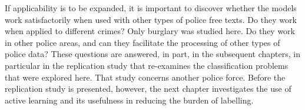 If applicability is to be expanded, it is important to discover whether the models work satisfactorily when used with other types of police free texts. Do they work when applied to different crimes? Only burglary was studied here. Do they work in other police areas, and can they facilitate the processing of other types of police data? These questions are answered, in part, in the subsequent chapters, in particular in the replication study that re-examines the classification problems that were explored here. That study concerns another police force. Before the replication study is presented, however, the next chapter investigates the use of active learning and its usefulness in reducing the burden of labelling.

